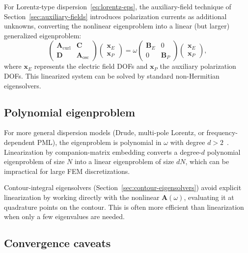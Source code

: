 For Lorentz-type dispersion~\eqref{eq:lorentz-eps}, the auxiliary-field
technique of Section~\ref{sec:auxiliary-fields} introduces polarization
currents as additional unknowns, converting the nonlinear eigenproblem
into a linear (but larger) generalized eigenproblem:
\begin{equation}
 \begin{pmatrix}
 \mathbf{A}_{\mathrm{curl}} & \mathbf{C} \\
 \mathbf{D} & \mathbf{A}_{\mathrm{osc}}
 \end{pmatrix}
 \begin{pmatrix} \mathbf{x}_E \\ \mathbf{x}_P \end{pmatrix}
 = \omega
 \begin{pmatrix}
 \mathbf{B}_E & 0 \\
 0 & \mathbf{B}_P
 \end{pmatrix}
 \begin{pmatrix} \mathbf{x}_E \\ \mathbf{x}_P \end{pmatrix},
 \label{eq:aux-linearized}
\end{equation}
where $\mathbf{x}_E$ represents the electric field DOFs and
$\mathbf{x}_P$ the auxiliary polarization DOFs. This linearized system
can be solved by standard non-Hermitian eigensolvers.

\subsection{Polynomial eigenproblem}
\label{ssec:polynomial-evp}

For more general dispersion models (Drude, multi-pole Lorentz, or
frequency-dependent PML), the eigenproblem is polynomial in $\omega$
with degree $d > 2$~\cite{jgopalakrishnan2022computing}. Linearization
by companion-matrix embedding converts a degree-$d$ polynomial
eigenproblem of size $N$ into a linear eigenproblem of size $dN$,
which can be impractical for large FEM discretizations.

Contour-integral eigensolvers (Section~\ref{sec:contour-eigensolvers})
avoid explicit linearization by working directly with the nonlinear
$\mathbf{A}(\omega)$, evaluating it at quadrature points on the contour.
This is often more efficient than linearization when only a few
eigenvalues are needed.

\subsection{Convergence caveats}
\label{ssec:convergence-caveats}

